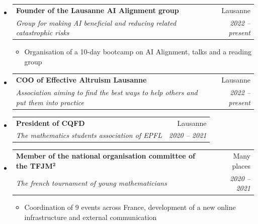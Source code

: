 \documentclass[letterpaper,11pt]{article}
\makeatletter
\newcommand{\Flag}[2]{%
  \scalebox{1}{%
    \scalebox{0}{#2}%
    \worldflag[width=0.32cm,framewidth=0px]{#1}}}
\newcommand{\CH}{\Flag{CH}{Switzerland}}
\newcommand{\FR}{\Flag{FR}{France}}
\newcommand{\resitem}[1]{\item #1 \vspace{-2pt}}
\newcommand{\ressubheading}[4]{
    \begin{tabular*}{6.5in}{l@{\cftdotfill{\cftsecdotsep}\extracolsep{\fill}}r}
      \textbf{#1} & #2 \\
      \textit{#3} & \textit{#4} \\
    \end{tabular*}\vspace{-8pt}}
\makeatother
\begin{document}
  \begin{itemize}
    \item
      \ressubheading{Founder of the Lausanne AI Alignment group}
        {Lausanne \CH}
        {Group for making AI beneficial and reducing related catastrophic risks}
        {2022 -- present}
      \begin{itemize}
        \resitem{Organisation of a 10-day bootcamp on AI Alignment, talks and a reading group}
      \end{itemize}

    \item
      \ressubheading{COO of Effective Altruism Lausanne}
        {Lausanne \CH}
        {Association aiming to find the best ways to help others and put them into practice}
        {2022 -- present}

    \item
      \ressubheading{President of CQFD}
        {Lausanne \CH}
        {The mathematics students association of EPFL}
        {2020 -- 2021}

    \item
      \ressubheading{Member of the national organisation committee of the TFJM$^\mathbf{2}$}
      {Many places \FR}
      {The french tournament of young mathematicians}
      {2020 -- 2021}
      \begin{itemize}
        \resitem{Coordination of 9 events across France, development of a new
          online infrastructure and external communication}
      \end{itemize}

  \end{itemize}
\end{document}
